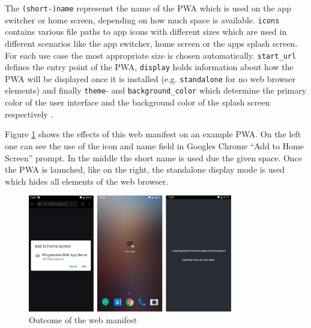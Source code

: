 \begin{center}
	\begin{minipage}{\textwidth}
		
	\end{minipage}
\end{center}

The \texttt{(short-)name} represenst the name of the  \acs{PWA} which is used on the app switcher or home screen, depending on how much space is available. \texttt{icons} contains various file paths to app icons with different sizes which are used in different scenarios like the app switcher, home screen or the apps splash screen. For each use case the most appropriate size is chosen automatically. \texttt{start\_url} defines the entry point of the  \acs{PWA}, \texttt{display} holds information about how the  \acs{PWA} will be displayed once it is installed (e.g. \texttt{standalone} for no web browser elements) and finally \texttt{theme}- and \texttt{background\_color} which determine the primary color of the user interface and the background color of the splash screen respectively \cite{HowMakePWAs}.

Figure \ref{fig:pwa_webmanifest} shows the effects of this web manifest on an example  \acs{PWA}. On the left one can see the use of the icon and name field in Googles Chrome “Add to Home Screen” prompt. In the middle the short name is used due the given space. Once the  \acs{PWA} is launched, like on the right, the standalone display mode is used which hides all elements of the web browser. 

\begin{figure}[htbp] 
	\centering
	\includegraphics[width=0.8\textwidth]{Assets/chapter_pwa/manifest_demo.png}
	\caption{Outcome of the web manifest}
	\label{fig:pwa_webmanifest}
\end{figure}


